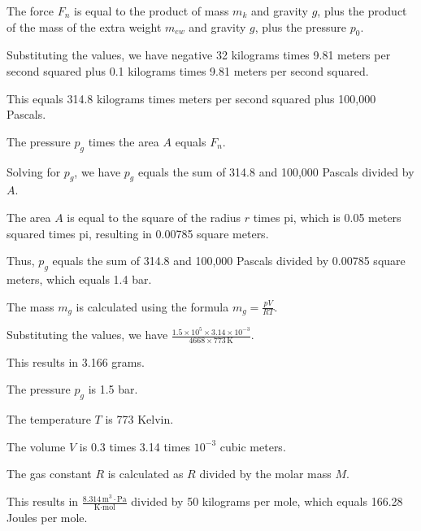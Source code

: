 The force \( F_n \) is equal to the product of mass \( m_k \) and gravity \( g \), plus the product of the mass of the extra weight \( m_{ew} \) and gravity \( g \), plus the pressure \( p_0 \).

Substituting the values, we have negative 32 kilograms times 9.81 meters per second squared plus 0.1 kilograms times 9.81 meters per second squared.

This equals 314.8 kilograms times meters per second squared plus 100,000 Pascals.

The pressure \( p_g \) times the area \( A \) equals \( F_n \).

Solving for \( p_g \), we have \( p_g \) equals the sum of 314.8 and 100,000 Pascals divided by \( A \).

The area \( A \) is equal to the square of the radius \( r \) times pi, which is 0.05 meters squared times pi, resulting in 0.00785 square meters.

Thus, \( p_g \) equals the sum of 314.8 and 100,000 Pascals divided by 0.00785 square meters, which equals 1.4 bar.

The mass \( m_g \) is calculated using the formula \( m_g = \frac{pV}{RT} \).

Substituting the values, we have \( \frac{1.5 \times 10^5 \times 3.14 \times 10^{-3}}{4668 \times 773 \, \text{K}} \).

This results in 3.166 grams.

The pressure \( p_g \) is 1.5 bar.

The temperature \( T \) is 773 Kelvin.

The volume \( V \) is 0.3 times 3.14 times \( 10^{-3} \) cubic meters.

The gas constant \( R \) is calculated as \( R \) divided by the molar mass \( M \).

This results in \( \frac{8.314 \, \text{m}^3 \cdot \text{Pa}}{\text{K} \cdot \text{mol}} \) divided by 50 kilograms per mole, which equals 166.28 Joules per mole.